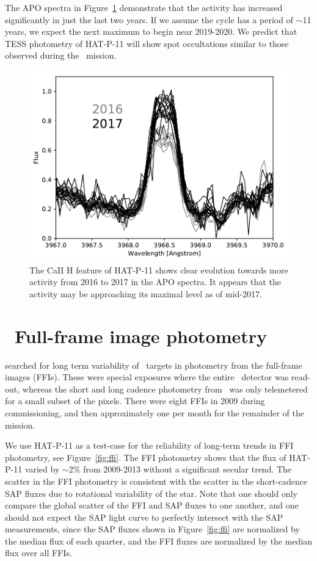 The APO spectra in Figure~\ref{fig:h} demonstrate that the activity has increased significantly in just the last two years. If we assume the cycle has a period of $\sim$11 years, we expect the next maximum to begin near 2019-2020. We predict that TESS photometry of HAT-P-11 will show spot occultations similar to those observed during the \kepler\ mission.

\begin{figure}
\begin{center}
\includegraphics[scale=0.8]{sindex/close_up_h.pdf}
\end{center}
\caption{The CaII H feature of HAT-P-11 shows clear evolution towards more activity from 2016 to 2017 in the APO spectra. It appears that the activity may be approaching its maximal level as of mid-2017.}
\label{fig:h}
\end{figure}

\section{\kepler\ Full-frame image photometry} \label{sec:ffi}

\citet{Montet2017} searched for long term variability of \kepler\ targets in photometry from the full-frame images (FFIs). These were special exposures where the entire \kepler\ detector was read-out, whereas the short and long cadence photometry from \kepler\ was only telemetered for a small subset of the pixels. There were eight FFIs in 2009 during commissioning, and then approximately one per month for the remainder of the mission.

We use HAT-P-11 as a test-case for the reliability of long-term trends in FFI photometry, see Figure~\ref{fig:ffi}. The FFI photometry shows that the flux of HAT-P-11 varied by $\sim 2\%$ from 2009-2013 without a significant secular trend. The scatter in the FFI photometry is consistent with the scatter in the short-cadence SAP fluxes due to rotational variability of the star. Note that one should only compare the global scatter of the FFI and SAP fluxes to one another, and one should not expect the SAP light curve to perfectly intersect with the SAP measurements, since the SAP fluxes shown in Figure~\ref{fig:ffi} are normalized by the median flux of each quarter, and the FFI fluxes are normalized by the median flux over all FFIs. 


